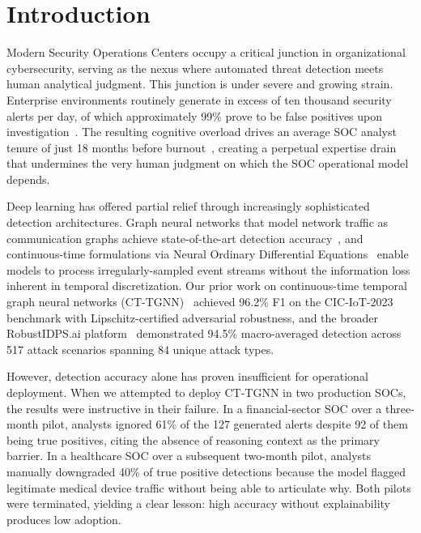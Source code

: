 \documentclass[preprint,review,12pt]{elsarticle}
\begin{document}
\section{Introduction}
\label{sec:introduction}

Modern Security Operations Centers occupy a critical junction in organizational cybersecurity, serving as the nexus where automated threat detection meets human analytical judgment. This junction is under severe and growing strain. Enterprise environments routinely generate in excess of ten thousand security alerts per day, of which approximately 99\% prove to be false positives upon investigation~\cite{acm_survey_2025}. The resulting cognitive overload drives an average SOC analyst tenure of just 18 months before burnout~\cite{cortex2025}, creating a perpetual expertise drain that undermines the very human judgment on which the SOC operational model depends.

Deep learning has offered partial relief through increasingly sophisticated detection architectures. Graph neural networks that model network traffic as communication graphs achieve state-of-the-art detection accuracy~\cite{gnn_ids_2024,te_gsage_2025}, and continuous-time formulations via Neural Ordinary Differential Equations~\cite{chen_neural_ode_2018} enable models to process irregularly-sampled event streams without the information loss inherent in temporal discretization. Our prior work on continuous-time temporal graph neural networks (CT-TGNN)~\cite{anaedevha_ct_tgnn} achieved 96.2\% F1 on the CIC-IoT-2023 benchmark with Lipschitz-certified adversarial robustness, and the broader RobustIDPS.ai platform~\cite{anaedevha_robustidps} demonstrated 94.5\% macro-averaged detection across 517 attack scenarios spanning 84 unique attack types.

However, detection accuracy alone has proven insufficient for operational deployment. When we attempted to deploy CT-TGNN in two production SOCs, the results were instructive in their failure. In a financial-sector SOC over a three-month pilot, analysts ignored 61\% of the 127 generated alerts despite 92 of them being true positives, citing the absence of reasoning context as the primary barrier. In a healthcare SOC over a subsequent two-month pilot, analysts manually downgraded 40\% of true positive detections because the model flagged legitimate medical device traffic without being able to articulate why. Both pilots were terminated, yielding a clear lesson: high accuracy without explainability produces low adoption.
\end{document}
